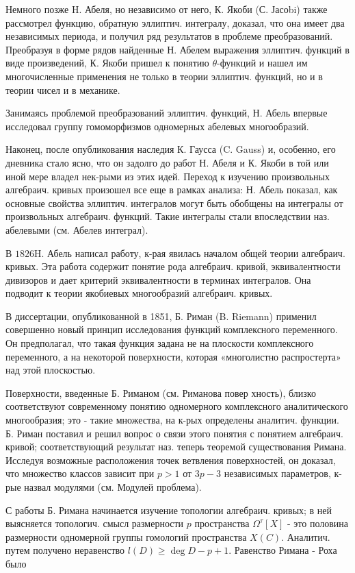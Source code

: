 \documentclass[10pt]{article}
\begin{document}
Немного позже $\mathrm{H}$. Абеля, но независимо от него, К. Якоби (С. Јасоbi) также рассмотрел функцию, обратную эллиптич. интегралу, доказал, что она имеет два независимых периода, и получил ряд результатов в проблеме преобразований. Преобразуя в форме рядов найденные Н. Абелем выражения эллиптич. функций в виде произведений, $К$. Якоби пришел к понятию $\theta$-функций и нашел им многочисленные применения не только в теории эллиптич. функций, но и в теории чисел и в механике.



Занимаясь проблемой преобразований эллиптич. функций, Н. Абель впервые исследовал группу гомоморфизмов одномерных абелевых многообразий.



Наконец, после опубликования наследия К. Гаусса (C. Gauss) и, особенно, его дневника стало ясно, что он задолго до работ Н. Абеля и К. Якоби в той или иной мере владел нек-рыми из этих идей. Переход к изучению произвольных алгебраич. кривых произошел все еще в рамках анализа: Н. Абель показал, как основные свойства эллиптич. интегралов могут быть обобщены на интегралы от произвольных алгебраич. функций. Такие интегралы стали впоследствии наз. абелевыми (см. Абелев интеграл).



В $1826 \mathrm{H}$. Абель написал работу, к-рая явилась началом общей теории алгебраич. кривых. Эта работа содержит понятие рода алгебраич. кривой, эквивалентности дивизоров и дает критерий эквивалентности в терминах интегралов. Она подводит к теории якобиевых многообразий алгебраич. кривых.



В диссертации, опубликованной в 1851, Б. Риман (B. Riemann) применил совершенно новый принцип исследования функций комплексного переменного. Он предполагал, что такая функция задана не на плоскости комплексного переменного, а на некоторой поверхности, которая «многолистно распростерта» над этой плоскостью.



Поверхности, введенные Б. Риманом (см. Риманова повер хность), близко соответствуют современному понятию одномерного комплексного аналитического многообразия; это - такие множества, на к-рых определены аналитич. функции. Б. Риман поставил и решил вопрос о связи этого понятия с понятием алгебраич. кривой; соответствующий результат наз. теперь теоремой существования Римана. Исследуя возможные расположения точек ветвления поверхностей, он доказал, что множество классов зависит при $p>1$ от $3 p-3$ независимых параметров, к-рые назвал модулями (см. Модулей проблема).



С работы Б. Римана начинается изучение топологии алгебраич. кривых; в ней выясняется топологич. смысл размерности $p$ пространства $\Omega^{\tau}[X]$ - это половина размерности одномерной группы гомологий пространства $X(C)$. Аналитич. путем получено неравенство $l(D) \geqslant \operatorname{deg} D-p+1$. Равенство Римана - Роха было
\end{document}
